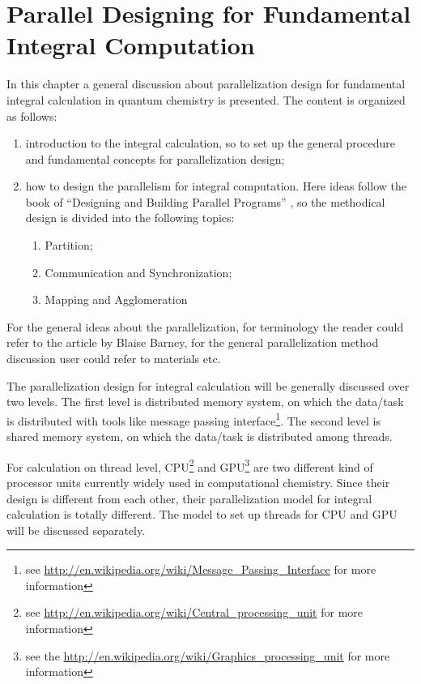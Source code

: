 %
%
\chapter{Parallel Designing for Fundamental Integral Computation}
\label{parallel_imp_integral}
%
%
%
In this chapter a general discussion about parallelization design
for fundamental integral calculation in quantum chemistry is presented.
The content is organized as follows:
\begin{enumerate}
 \item introduction to the integral calculation, so to set up
 the general procedure and fundamental concepts for parallelization design;
 \item how to design the parallelism for integral computation. Here
 ideas follow the book of ``Designing and Building Parallel Programs''
 \cite{foster1995designingparallel}, so the methodical design is divided into
 the following topics:
 \begin{enumerate}
  \item Partition;
  \item Communication and Synchronization;
  \item Mapping and Agglomeration
 \end{enumerate}
\end{enumerate}

For the general ideas about the parallelization, for terminology the reader
could refer to the article by Blaise Barney\cite{barney2010parallelintroduction},
for the general parallelization method discussion user could refer to materials
\cite{kumar1994parallelintroduction, pacheco2011parallelintroduction} etc.

The parallelization design for integral calculation will be generally discussed
over two levels. The first level is distributed memory system, on which the 
data/task is distributed with tools like message passing interface\footnote{
see \url{http://en.wikipedia.org/wiki/Message_Passing_Interface} for more information}.
The second level is shared memory system, on which the data/task is distributed
among threads.

For calculation on thread level, CPU\footnote{see 
\url{http://en.wikipedia.org/wiki/Central_processing_unit}
for more information} and GPU\footnote{see the 
\url{http://en.wikipedia.org/wiki/Graphics_processing_unit} 
for more information} are two different kind of processor units currently 
widely used in computational chemistry. Since their design is different from
each other, their parallelization model for integral calculation is 
totally different. The model to set up threads for CPU and GPU will be 
discussed separately.

